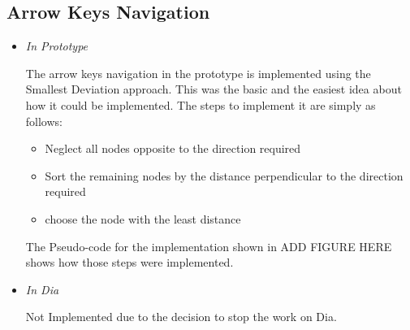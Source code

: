 \subsection{Arrow Keys Navigation}
\begin{itemize}
\item {\it In Prototype}
\par \noindent
The arrow keys navigation in the prototype is implemented using the Smallest Deviation approach. This was the basic and the easiest idea about how it could be implemented.
The steps to implement it are simply as follows:
\begin{itemize}
\item Neglect all nodes opposite to the direction required
\item Sort the remaining nodes by the distance perpendicular to the direction required
\item choose the node with the least distance
\end{itemize}
The Pseudo-code for the implementation shown in ADD FIGURE HERE shows how those steps were implemented.

\item {\it In Dia}
\par \noindent
Not Implemented due to the decision to stop the work on Dia.
\end{itemize}

